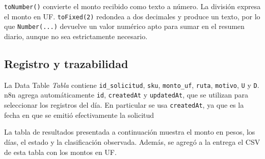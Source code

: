 \documentclass[11pt,letterpaper]{article}
\begin{document}
\texttt{toNumber()} convierte el monto recibido como texto a número. La división expresa el monto en UF. \texttt{toFixed(2)} redondea a dos decimales y produce un texto, por lo que \texttt{Number(...)} devuelve un valor numérico apto para sumar en el resumen diario, aunque no sea estrictamente necesario.

\subsection{Registro y trazabilidad}
La Data Table \textit{Tabla} contiene \texttt{id\_solicitud}, \texttt{sku}, \texttt{monto\_uf}, \texttt{ruta}, \texttt{motivo}, \texttt{U} y \texttt{D}. n8n agrega automáticamente \texttt{id}, \texttt{createdAt} y \texttt{updatedAt}, que se utilizan para seleccionar los registros del día. En particular se usa \texttt{createdAt}, ya que es la fecha en que se emitió efectivamente la solicitud

La tabla de resultados presentada a continuación muestra el monto en pesos, los días, el estado y la clasificación observada. Además, se agregó a la entrega el CSV de esta tabla con los montos en UF.
\end{document}

